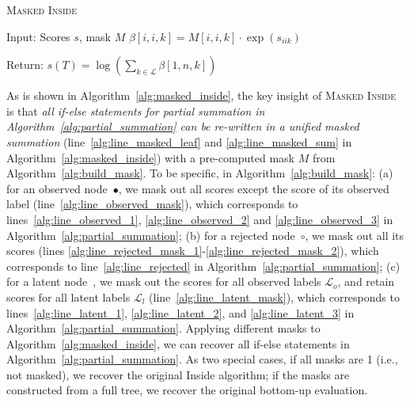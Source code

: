 \begin{algorithm}[t!]
  \small
  \caption{\label{alg:masked_inside} \textsc{Masked Inside}}
  \begin{algorithmic}[1]
  
  \State Input: Scores $s$, mask $M$
    \State $\beta[i, i, k] = M[i, i, k] \cdot \exp(s_{iik})$ \label{alg:line_masked_leaf}  
  \EndFor
\State {}
\State {}
  \EndFor

  \State Return: $s(T) = \log(\sum_{k \in \mathcal{L}} \beta[1, n, k])$
  
\end{algorithmic}
\end{algorithm}

 

As is shown in Algorithm~\ref{alg:masked_inside}, the key insight of \textsc{Masked Inside} is that \textit{all if-else statements for partial summation in Algorithm~\ref{alg:partial_summation} 
can be re-written in a unified masked summation} (line~\ref{alg:line_masked_leaf} and \ref{alg:line_masked_sum} in Algorithm~\ref{alg:masked_inside}) with a pre-computed mask $M$ from Algorithm~\ref{alg:build_mask}. 
To be specific, in Algorithm~\ref{alg:build_mask}: 
(a) for an observed node~$\bullet$, we mask out all scores except the score of its observed label (line~\ref{alg:line_observed_mask}), 
which corresponds to lines~\ref{alg:line_observed_1}, \ref{alg:line_observed_2} and \ref{alg:line_observed_3} in Algorithm~\ref{alg:partial_summation}; 
(b) for a rejected node~$\circ$, we mask out all its scores (lines \ref{alg:line_rejected_mask_1}-\ref{alg:line_rejected_mask_2}), which corresponds to line~\ref{alg:line_rejected} in Algorithm~\ref{alg:partial_summation}; 
(c) for a latent node~\scalebox{0.8}{$\square$}, we mask out the scores for all observed labels $\mathcal{L}_o$, and retain scores for all latent labels $\mathcal{L}_l$ (line~\ref{alg:line_latent_mask}), which corresponds to lines~\ref{alg:line_latent_1}, \ref{alg:line_latent_2}, and \ref{alg:line_latent_3} in Algorithm~\ref{alg:partial_summation}. 
Applying different masks to Algorithm~\ref{alg:masked_inside}, we can recover all if-else statements in Algorithm~\ref{alg:partial_summation}. 
As two special cases, if all masks are 1 (i.e., not masked), we recover the original Inside algorithm; if the masks are constructed from a full tree, we recover the original bottom-up evaluation. 

